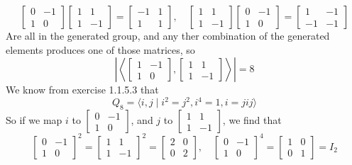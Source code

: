 \documentclass{article}
\begin{document}
    \[ \begin{bmatrix} 0 & -1 \\ 1 & 0 \end{bmatrix}
    \begin{bmatrix} 1 & 1 \\ 1 & -1 \end{bmatrix}
    = \begin{bmatrix} -1 & 1 \\ 1 & 1 \end{bmatrix}, \quad
    \begin{bmatrix} 1 & 1 \\ 1 & -1 \end{bmatrix}
    \begin{bmatrix} 0 & -1 \\ 1 & 0 \end{bmatrix}
    = \begin{bmatrix} 1 & -1 \\ -1 & -1 \end{bmatrix} \]
    Are all in the generated group,
    and any ther combination of the generated elements
    produces one of those matrices,
    so 
    \[ \left| \left\langle \begin{bmatrix} 1 & -1 \\ 1 & 0 \end{bmatrix},
    \begin{bmatrix} 1 & 1 \\ 1 & -1 \end{bmatrix} \right\rangle \right|
    = 8 \]
    We know from exercise 1.1.5.3 that
    \[ Q_8 = \langle i, j \mid i^2 = j^2, i^4 = 1, i = jij \rangle \]
    So if we map $i$ to $\begin{bmatrix} 0 & -1 \\ 1 & 0 \end{bmatrix}$,
    and $j$ to $\begin{bmatrix} 1 & 1 \\ 1 & -1 \end{bmatrix}$,
    we find that
    \[ \begin{bmatrix} 0 & -1 \\ 1 & 0 \end{bmatrix}^2
    = \begin{bmatrix} 1 & 1 \\ 1 & -1 \end{bmatrix}^2
    = \begin{bmatrix} 2 & 0 \\ 0 & 2 \end{bmatrix}, \quad
    \begin{bmatrix} 0 & -1 \\ 1 & 0 \end{bmatrix}^4
    = \begin{bmatrix} 1 & 0 \\ 0 & 1 \end{bmatrix} = I_2 \]
\end{document}
